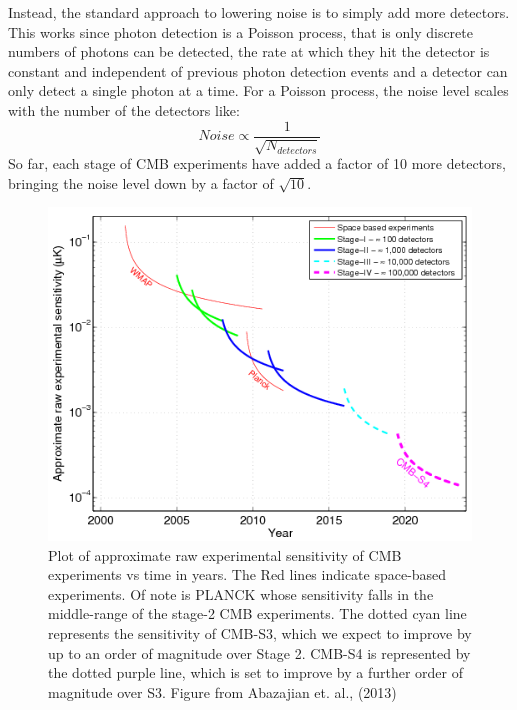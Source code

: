 Instead, the standard approach to lowering noise is to simply add more detectors. This works since photon detection is a Poisson process, that is only discrete numbers of photons can be detected, the rate at which they hit the detector is constant and independent of previous photon detection events and a detector can only detect a single photon at a time. For a Poisson process, the noise level scales with the number of the detectors like: $$ Noise \propto \frac{1}{\sqrt{N_{detectors}}}$$ So far, each stage of CMB experiments have added a factor of 10 more detectors, bringing the noise level down by a factor of $\sqrt{10}$.

\begin{figure}[t]
\centering
\includegraphics[scale=0.75]{images/experiments.png} 
\caption{Plot of approximate raw experimental sensitivity of CMB experiments vs time in years. The Red lines indicate space-based experiments. Of note is PLANCK whose sensitivity falls in the middle-range of the stage-2 CMB experiments. The dotted cyan line represents the sensitivity of CMB-S3, which we expect to improve by up to an order of magnitude over Stage 2. CMB-S4 is represented by the dotted purple line, which is set to improve by a further order of magnitude over S3. Figure from Abazajian et. al., (2013) \cite{Abazajian:2013oma}}
\end{figure}

